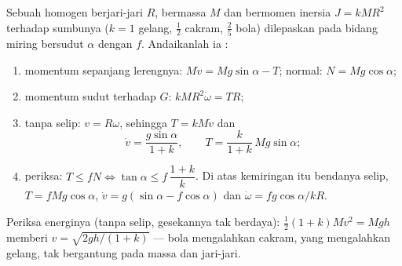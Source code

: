 \begin{method}\label{met:b2:rigid-body-mechanics:incline}
Sebuah  homogen berjari-jari $R$, bermassa $M$ dan bermomen
inersia $J =
kMR^2$ terhadap sumbunya ($k = 1$ gelang, $\tfrac12$ cakram, $\tfrac25$
bola) dilepaskan pada bidang miring bersudut $\alpha$ dengan  $f$. Andaikanlah ia :
\begin{enumerate}
  \item momentum sepanjang lerengnya: $M\dot v = Mg\sin\alpha - T$;
        normal: $N = Mg\cos\alpha$;
  \item momentum sudut terhadap $G$: $kMR^2\dot\omega = TR$;
  \item tanpa selip: $v = R\omega$, sehingga $T = kM\dot v$ dan
        \[
        \dot v = \frac{g\sin\alpha}{1 + k} , \qquad T = \frac{k}{1 + k}\,
        Mg\sin\alpha ;
        \]
  \item periksa: $T \le fN \iff \tan\alpha \le f\,\dfrac{1 + k}{k}$.
        Di atas kemiringan itu bendanya selip, $T = fMg\cos\alpha$, $\dot v =
        g(\sin\alpha - f\cos\alpha)$ dan $\dot\omega = fg\cos\alpha/kR$.
\end{enumerate}
Periksa energinya (tanpa selip, gesekannya tak berdaya): $\tfrac12(1 + k)Mv^2 =
Mgh$ memberi $v = \sqrt{2gh/(1 + k)}$ --- bola mengalahkan cakram, yang
mengalahkan gelang, tak bergantung pada massa dan jari-jari.
\end{method}

